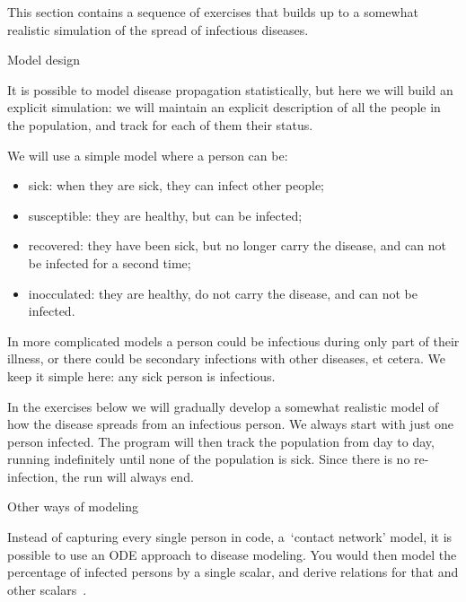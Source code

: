 
This section contains a sequence of exercises that builds up to a
somewhat realistic simulation of the spread of infectious
diseases. 

 {Model design}

It is possible to model disease propagation statistically, but here we
will build an explicit simulation: we will maintain an explicit
description of all
the people in the population, and track for each of them their status.

We will use a simple model where a person can be:
\begin{itemize}
\item sick: when they are sick, they can infect other people;
\item susceptible: they are healthy, but can be infected;
\item recovered: they have been sick, but no longer carry the disease,
  and can not be infected for a second time;
\item inocculated: they are healthy, do not carry the disease, and can
  not be infected.
\end{itemize}
In more complicated models a person could be infectious during only
part of their illness, or there could be secondary infections with
other diseases, et cetera. We keep it simple here:
any sick person is infectious.

In the exercises below we will gradually develop a somewhat realistic
model of how the disease spreads from an infectious person. We always
start with just one person infected.
The program will then track the population from day to day,
running indefinitely until none of the population
is sick. Since there is no re-infection, the run will always end.

 {Other ways of modeling}

Instead of capturing every single person in code, a~`contact network'
model,
it is possible to use an
\ac{ODE} approach to disease modeling. You would then model the
percentage of infected persons by a single scalar, and derive
relations for that and other scalars~\cite{Anderson:population1979}.

